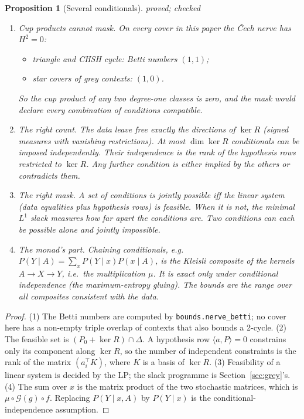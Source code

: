 \documentclass[11pt]{article}
\newtheorem{proposition}[theorem]{Proposition}
\theoremstyle{definition}
\theoremstyle{remark}
\newcommand{\st}[1]{\textsf{\small\color{gray}#1}}
\begin{document}
\begin{proposition}[Several conditionals]\label{prop:multicond}\st{proved; checked}
\leavevmode
\begin{enumerate}
  \item \emph{Cup products cannot mask.} On every cover in this paper the Čech nerve has $H^2=0$:
  \begin{itemize}
    \item triangle and CHSH cycle: Betti numbers $(1,1)$;
    \item star covers of grey contexts: $(1,0)$.
  \end{itemize}
  So the cup product of any two degree-one classes is zero, and the mask would declare every combination of conditions compatible.
  \item \emph{The right count.} The data leave free exactly the directions of $\ker R$ (signed measures with vanishing restrictions). At most $\dim\ker R$ conditionals can be imposed independently. Their independence is the rank of the hypothesis rows restricted to $\ker R$. Any further condition is either implied by the others or contradicts them.
  \item \emph{The right mask.} A set of conditions is jointly possible iff the linear system (data equalities plus hypothesis rows) is feasible. When it is not, the minimal $L^1$ slack measures how far apart the conditions are. Two conditions can each be possible alone and jointly impossible.
  \item \emph{The monad's part.} Chaining conditionals, e.g.\ $P(Y\mid A)=\sum_xP(Y\mid x)P(x\mid A)$, is the Kleisli composite of the kernels $A\to X\to Y$, i.e.\ the multiplication $\mu$. It is exact only under conditional independence (the maximum-entropy gluing). The bounds are the range over all composites consistent with the data.
\end{enumerate}
\end{proposition}
\begin{proof}
(1) The Betti numbers are computed by \texttt{bounds.nerve\_betti}; no cover here has a non-empty triple overlap of contexts that also bounds a 2-cycle. (2) The feasible set is $(P_0+\ker R)\cap\Delta$. A hypothesis row $\langle a,P\rangle=0$ constrains only its component along $\ker R$, so the number of independent constraints is the rank of the matrix $(a_i^\top K)$, where $K$ is a basis of $\ker R$. (3) Feasibility of a linear system is decided by the LP; the slack programme is Section~\ref{sec:grey}'s. (4) The sum over $x$ is the matrix product of the two stochastic matrices, which is $\mu\circ\mathcal G(g)\circ f$. Replacing $P(Y\mid x,A)$ by $P(Y\mid x)$ is the conditional-independence assumption.
\end{proof}
\end{document}
